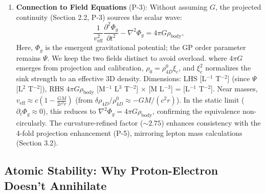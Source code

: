 \begin{enumerate}
\item \textbf{Connection to Field Equations} (P-3): Without assuming $G$, the projected continuity (Section 2.2, P-3) sources the scalar wave:
   \[
   \frac{1}{v_{\text{eff}}^2} \frac{\partial^2 \Phi_g}{\partial t^2} - \nabla^2 \Phi_g = 4\pi G \rho_{\text{body}},
   \]
Here, $\Phi_g$ is the emergent gravitational potential; the GP order parameter remains $\Psi$. We keep the two fields distinct to avoid overload.
   where $4\pi G$ emerges from projection and calibration, $\rho_0 = \rho_{4D}^0 \xi_c$, and $\xi_c^2$ normalizes the sink strength to an effective 3D density. Dimensions: LHS [L$^{-1}$ T$^{-2}$] (since $\Psi$ [L$^2$ T$^{-2}$]), RHS $4\pi G \rho_{\text{body}}$ [M$^{-1}$ L$^3$ T$^{-2}$] $\times$ [M L$^{-3}$] = [L$^{-1}$ T$^{-2}$]. Near masses, $v_{\text{eff}} \approx c \left(1 - \frac{G M}{2 c^2 r}\right)$ (from $\delta \rho_{4D} / \rho_{4D}^0 \approx - G M / (c^2 r)$). In the static limit ($\partial_t \Phi_g \approx 0$), this reduces to $\nabla^2 \Phi_g = 4\pi G \rho_{\text{body}}$, confirming the equivalence non-circularly. The curvature-refined factor ($\sim 2.75$) enhances consistency with the 4-fold projection enhancement (P-5), mirroring lepton mass calculations (Section 3.2).
\end{enumerate}


\subsection{Atomic Stability: Why Proton-Electron Doesn't Annihilate}

